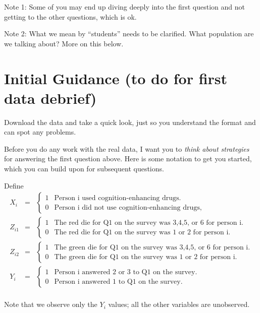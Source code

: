 \documentclass[11pt, oneside]{article}   	%
\begin{document}
Note 1: Some of you may end up diving deeply into the first question and not getting to the other questions, which is ok.

Note 2: What we mean by ``students'' needs to be clarified. What population are we talking about? More on this below.

\section{Initial Guidance (to do for first data debrief)}

Download the data and take a quick look, just so you understand the format and can spot any problems.

Before you do any work with the real data, I want you to {\em think about strategies} for answering the first question above. Here is some notation to get you started, which you can build upon for subsequent questions.

Define
\begin{eqnarray*}
X_{i} &=& \left\{ \begin{array}{ll}
1 & \mbox{Person i used cognition-enhancing drugs.}\\
0 & \mbox{Person i did not use cognition-enhancing drugs,}
\end{array}  \right.\\
Z_{i1} &=& \left\{ \begin{array}{ll}
1 & \mbox{The red die for Q1 on the survey was 3,4,5, or 6 for person i.}\\
0 & \mbox{The red die for Q1 on the survey was 1 or 2 for person i.}
\end{array}  \right.\\
Z_{i2} &=& \left\{ \begin{array}{ll}
1 & \mbox{The green die for Q1 on the survey was 3,4,5, or 6 for person i.}\\
0 & \mbox{The green die for Q1 on the survey was 1 or 2 for person i.}
\end{array}  \right.\\
Y_{i} &=& \left\{ \begin{array}{ll}
1 & \mbox{Person i answered 2 or 3 to Q1 on the survey.}\\
0 & \mbox{Person i answered 1 to Q1 on the survey.}
\end{array}  \right.\\
\end{eqnarray*}

Note that we observe only the $Y_i$ values; all the other variables are unobserved. 
\end{document}
